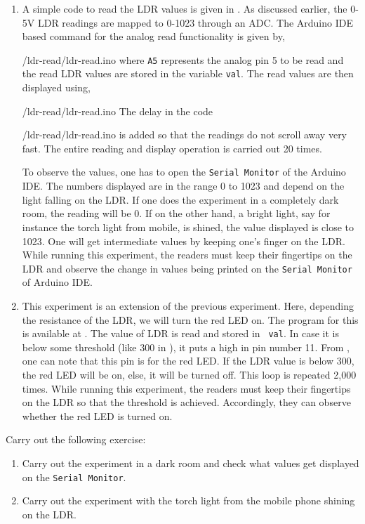 \begin{enumerate}
\item A simple code to read the LDR values is given in
  . As discussed earlier, the 0-5V LDR readings
  are mapped to 0-1023 through an ADC. The 
  Arduino IDE
  based command for the analog read functionality is given by,
  
  {\LocLDRardcode/ldr-read/ldr-read.ino} where {\tt A5} represents the
  analog pin 5 to be read and the read LDR values are stored in the
  variable {\tt val}.  The read values are then displayed using,
  
  {\LocLDRardcode/ldr-read/ldr-read.ino} The delay in the code  
  
  {\LocLDRardcode/ldr-read/ldr-read.ino} is added so that the readings
  do not scroll away very fast.  The entire reading and display
  operation is carried out 20 times. 

  To observe the values, one has to open the {\tt Serial Monitor} of
  the Arduino IDE.  The numbers displayed are in the range 0 to 1023
  and depend on the light falling on the LDR.  If one does the
  experiment in a completely dark room, the reading will be 0.  If on
  the other hand, a bright light, say for instance the torch light
  from mobile, is shined, the value displayed is close to 1023.  One
  will get intermediate values by keeping one's finger on the LDR. 
  While running this experiment, the readers must keep their fingertips on the LDR and
  observe the change in values being printed on the
  {\tt Serial Monitor} of Arduino IDE.

\item This experiment is an extension of the previous
experiment. Here, depending the resistance of the LDR, we will
  turn the red LED on.  The program for this is available at
  .  The value of LDR is read and stored in {\tt
    val}.  In case it is below some threshold (like 300 in ), 
    it puts a high in pin number 11.  From , 
    one can note that this pin is for the red LED.  If the LDR value is below 300, 
    the red LED will be on, else, it will be turned off.  
    This loop is repeated 2,000 times. While running this experiment, the readers 
    must keep their fingertips on the LDR so that the threshold is achieved. Accordingly, 
    they can observe whether the red LED is turned on. 
\end{enumerate}

\begin{exercise}
Carry out the following exercise:
\begin{enumerate}
\item Carry out the experiment in a dark room and check what values
  get displayed on the {\tt Serial Monitor}.
\item Carry out the experiment with the torch light from the mobile
  phone shining on the LDR.
\end{enumerate}
\end{exercise}

